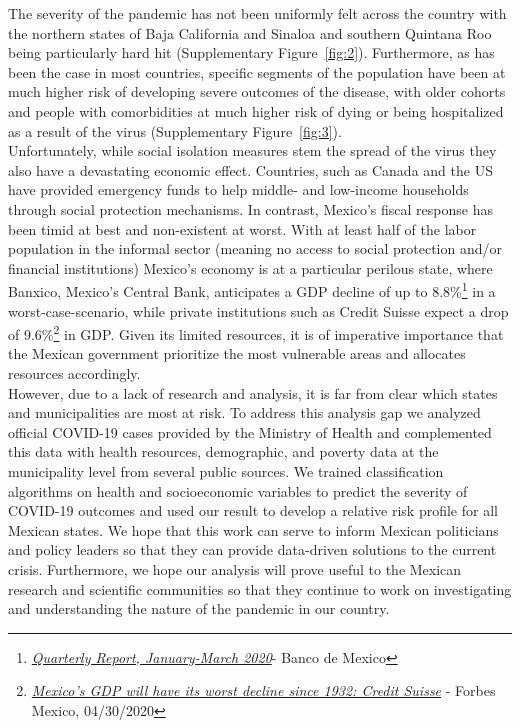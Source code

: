 \documentclass[hidelinks,10pt]{article}
\begin{document}
	The severity of the pandemic has not been uniformly felt across the country with the northern states of Baja California and Sinaloa and southern Quintana Roo being particularly hard hit (Supplementary Figure~\ref{fig:2}). Furthermore, as has been the case in most countries, specific segments of the population have been at much higher risk of developing severe outcomes of the disease, with older cohorts and people with comorbidities at much higher risk of dying or being hospitalized as a result of the virus (Supplementary Figure~\ref{fig:3}).\\
Unfortunately, while social isolation measures stem the spread of the virus they also have a devastating economic effect.  Countries, such as Canada and the US have provided emergency funds to help middle- and low-income households through social protection mechanisms. In contrast,  Mexico’s fiscal response has been timid at best and non-existent at worst. With at least half of the labor population in the informal sector  (meaning no access to social protection and/or financial institutions) Mexico’s economy is at a particular perilous state, where Banxico,
Mexico's Central Bank, anticipates a GDP decline of up to 8.8\%\footnote{\href{https://www.banxico.org.mx/publicaciones-y-prensa/informes-trimestrales/\%7B23C2DCA8-4AD3-FBE0-B0BF-4D30C8066B84\%7D.pdf}{\textit{Quarterly Report, January-March 2020}}- Banco de Mexico} in a worst-case-scenario, while private institutions such as Credit Suisse expect a drop of 9.6\%\footnote{\href{https://www.forbes.com.mx/economia-pib-mexico-tendra-peor-caida-1932-credit-suisse/}{\textit{Mexico's GDP will have its worst decline since 1932: Credit Suisse}} - Forbes Mexico, 04/30/2020} in GDP. Given its limited resources, it is of imperative importance that the Mexican government prioritize the most vulnerable areas and allocates resources accordingly.\\
However, due to a lack of research and analysis, it is far from clear which states and municipalities are most at risk. To address this analysis gap we analyzed official COVID-19 cases provided by the Ministry of Health and complemented this data with health resources, demographic, and poverty data at the municipality level from several public sources. We trained classification algorithms on health and socioeconomic variables to predict the severity of COVID-19 outcomes and used our result to develop a relative risk profile for all Mexican states. We hope that this work can serve to inform Mexican politicians and policy leaders so that they can provide data-driven solutions to the current crisis. Furthermore, we hope our analysis will prove useful to the Mexican research and scientific communities so that they continue to work on investigating and understanding the nature of the pandemic in our country.
\end{document}
